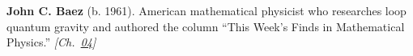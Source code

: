 \textbf{John C. Baez} (b. 1961). American mathematical physicist who researches loop quantum gravity and authored the column ``This Week's Finds in Mathematical Physics.'' \emph{[Ch.~\hyperref[ch:energytransmission]{04}]}

